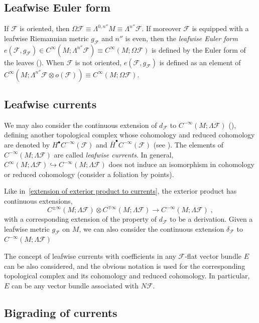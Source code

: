\documentclass{memo-l}
\theoremstyle{plain}
\theoremstyle{definition}
\theoremstyle{remark}
\newcommand{\FF}{\mathcal{F}}
\numberwithin{section}{chapter}
\numberwithin{equation}{section}%
\begin{document}
\subsection{Leafwise Euler form}\label{ss: e(FF g_FF)}

If $\FF$ is oriented, then $\Omega\FF\equiv\Lambda^{0,n''}M\equiv\Lambda^{n''}\FF$. If moreover $\FF$ is equipped with a leafwise Riemannian metric $g_\FF$ and $n''$ is even, then the \emph{leafwise Euler form} $e(\FF,g_\FF)\in C^\infty(M;\Lambda^{n''}\FF)\equiv C^\infty(M;\Omega\FF)$\index{$e(\FF,g_\FF)$} is defined by the Euler form of the leaves (). When $\FF$ is not oriented, $e(\FF,g_\FF)$ is defined as an element of $C^\infty(M;\Lambda^{n''}\FF\otimes o(\FF))\equiv C^\infty(M;\Omega\FF)$.


\subsection{Leafwise currents}\label{ss: leafwise currents}

We may also consider the continuous extension of $d_\FF$ to $C^{-\infty}(M;\Lambda\FF)$ (), defining another topological complex whose cohomology and reduced cohomology are denoted by $H^\bullet C^{-\infty}(\FF)$ and $\bar H^\bullet C^{-\infty}(\FF)$ (see ). The elements of $C^{-\infty}(M;\Lambda\FF)$ are called \emph{leafwise currents}. In general, $C^\infty(M;\Lambda\FF)\hookrightarrow C^{-\infty}(M;\Lambda\FF)$ does not induce an isomorphism in cohomology or reduced cohomology (consider a foliation by points). 

Like in~\eqref{extension of exterior product to currents}, the exterior product has continuous extensions,
\[
C^{\pm\infty}(M;\Lambda\FF)\otimes C^{\mp\infty}(M;\Lambda\FF)\to C^{-\infty}(M;\Lambda\FF)\;,
\]
with a corresponding extension of the property of $d_\FF$ to be a derivation. Given a leafwise metric $g_\FF$ on $M$, we can also consider the continuous extension $\delta_\FF$ to $C^{-\infty}(M;\Lambda\FF)$

The concept of leafwise currents with coefficients in any $\FF$-flat vector bundle $E$ can be also considered, and the obvious notation is used for the corresponding topological complex and its cohomology and reduced cohomology. In particular, $E$ can be any vector bundle associated with $N\FF$.


\subsection{Bigrading of currents}\label{ss: bigrading of currents}
\end{document}
